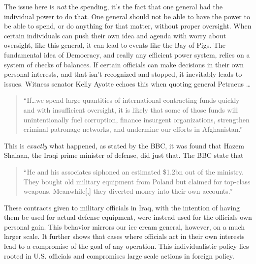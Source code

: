 \documentclass[12pt, draft]{article}
\begin{document}
        The issue here is \textit{not} the spending, it's the fact that one general had the individual power to do that. One general should not be able to have the power to be able to spend, or do anything for that matter, without proper oversight. When certain individuals can push their own idea and agenda with worry about oversight, like this general, it can lead to events like the Bay of Pigs. The fundamental idea of Democracy, and really any efficient power system, relies on a system of checks of balances. If certain officials can make decisions in their own personal interests, and that isn't recognized and stopped, it inevitably leads to issues. Witness senator Kelly Ayotte echoes this when quoting general Petraeus \ldots

        \begin{quote}
            ``If\ldots we spend large quantities of international contracting funds quickly and with insufficient oversight, it is likely that some of those funds will unintentionally fuel corruption, finance insurgent organizations, strengthen criminal patronage networks, and undermine our efforts in Afghanistan.'' \parencite{us_senate2011wartime_contracting}
        \end{quote}

        This is \textit{exactly} what happened, as stated by the BBC, it was found that Hazem Shalaan, the Iraqi prime minister of defense, did just that. The BBC state that

        \begin{quote}
            ``He and his associates siphoned an estimated \$1.2bn out of the ministry. They bought old military equipment from Poland but claimed for top-class weapons. Meanwhile[,] they diverted money into their own accounts.'' \parencite{bbc2008iraqcontracts}
        \end{quote}

        These contracts given to military officials in Iraq, with the intention of having them be used for actual defense equipment, were instead used for the officials own personal gain. This behavior mirrors our ice cream general, however, on a much larger scale. It further shows that cases where officials act in their own interests lead to a compromise of the goal of any operation. This individualistic policy lies rooted in U.S. officials and compromises large scale actions in foreign policy.
        
\end{document}
